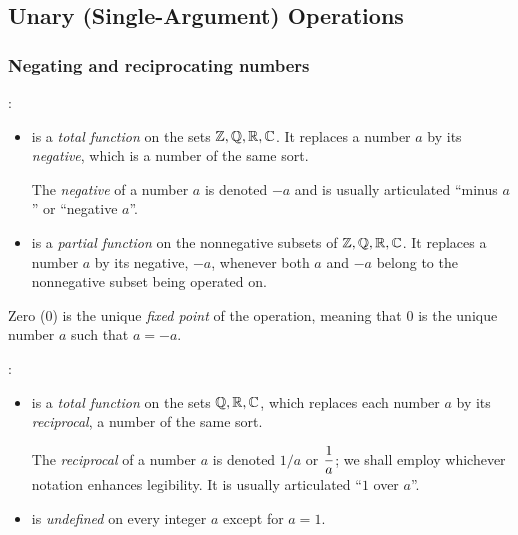 \subsection{Unary (Single-Argument) Operations}
\label{sec:unary-ops}

\subsubsection{Negating and reciprocating numbers}
 

:
\begin{itemize}
\item
is a {\em total function} on the sets $\mathbb{Z}, \mathbb{Q}, \mathbb{R}, \mathbb{C}$.  It replaces a number $a$ by its {\em negative}, which is a number of the same sort.

\smallskip

The {\it negative} of a number $a$ is denoted $-a$ and is usually articulated ``minus $a$'' or ``negative $a$''.
\medskip\item
is a {\em partial function} on the nonnegative subsets of $\mathbb{Z}, \mathbb{Q}, \mathbb{R}, \mathbb{C}$.  It replaces a number $a$ by its negative, $-a$, whenever both $a$ and $-a$ belong to the nonnegative subset being
operated on.
\end{itemize}
Zero ($0$) is the unique {\it fixed point} of the operation, meaning that $0$ is the unique number $a$ such that $a = -a$.
 

\medskip

 

:
\begin{itemize}
\item
is a {\em total function} on the sets $\mathbb{Q}, \mathbb{R}, \mathbb{C}$, which replaces each number $a$ by its {\em reciprocal}, a number of the same sort.

\smallskip

The {\it reciprocal} of  a number $a$ is denoted $1/a$ or $\displaystyle {1 \over a}$; we shall employ whichever notation enhances legibility.  It is usually articulated ``$1$ over $a$''.

\medskip\item
is {\em undefined} on every integer $a$ except for $a=1$.
\end{itemize}

